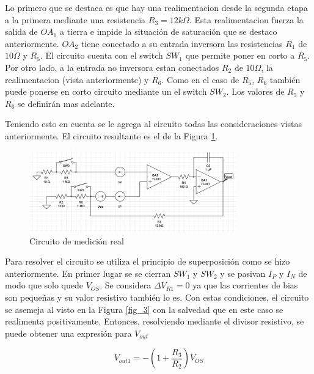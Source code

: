 Lo primero que se destaca es que hay una realimentacion desde la segunda etapa a la primera mediante una resistencia $R_3 = 12k\Omega$. Esta realimentacion fuerza la salida de $OA_1$ a tierra e impide la situación de saturación que se destaco
anteriormente.  $OA_2$ tiene conectado a su entrada inversora las resistencias $R_1$ de $10\Omega$ y $R_5$. El circuito cuenta con el switch $SW_1$ que permite poner en corto a $R_5$. Por otro lado,
a la entrada no inversora estan conectados $R_2$ de $10\Omega$, la realimentacion (vista anteriormente) y $R_6$. Como en el caso de $R_5$, $R_6$ también puede
ponerse en corto circuito mediante un el switch $SW_2$. Los valores de $R_5$ y $R_6$ se definirán mas adelante. 

Teniendo esto en cuenta se le agrega al circuito todas las consideraciones vistas anteriormente. El circuito resultante es el de la Figura \ref{medicion_real}.

\begin{figure}[ht]                                                       
    \centering\includegraphics[width=0.8\textwidth]{../Ex3/Figuras/fig_8.png}
     \caption{Circuito de medición real}
     \label{medicion_real}
     \end{figure}

Para resolver el circuito se utiliza el principio de superposición como se hizo anteriormente. En primer lugar se se cierran $SW_1$ y $SW_2$ y se pasivan $I_P$ y $I_N$ de modo que solo quede $V_{OS}$.
Se considera $\Delta V_{R1} = 0$ ya que las corrientes de bias son pequeñas y su valor resistivo también lo es. Con estas condiciones, el circuito se asemeja al visto en la Figura \ref{fig_3} con la salvedad que en este caso se realimenta positivamente. Entonces, resolviendo
mediante el divisor resistivo, se puede obtener una expresión para $V_{out}$

\begin{equation} V_{out1} = -(1 + \frac{R_3}{R_2})V_{OS} \label{ecuacion_Vout_1}\end{equation}

